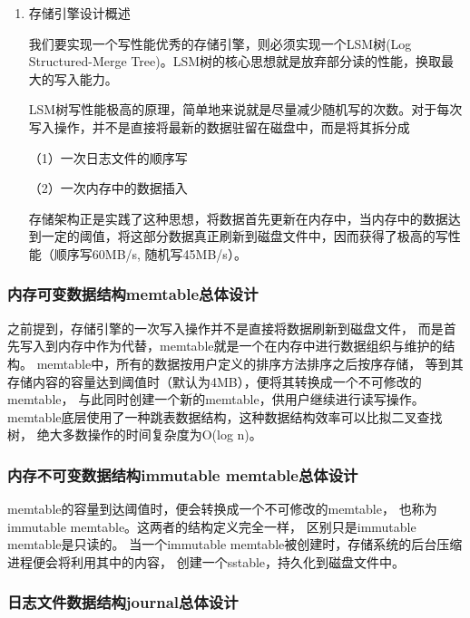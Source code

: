 	\begin{enumerate}[fullwidth,itemindent=2em,listparindent=2em]
	
		\item 存储引擎设计概述
		
		我们要实现一个写性能优秀的存储引擎，则必须实现一个LSM树(Log Structured-Merge Tree)。LSM树的核心思想就是放弃部分读的性能，换取最大的写入能力。

		LSM树写性能极高的原理，简单地来说就是尽量减少随机写的次数。对于每次写入操作，并不是直接将最新的数据驻留在磁盘中，而是将其拆分成
		
		（1）{一次日志文件的顺序写}

		（2）{一次内存中的数据插入}

		存储架构正是实践了这种思想，将数据首先更新在内存中，当内存中的数据达到一定的阈值，将这部分数据真正刷新到磁盘文件中，因而获得了极高的写性能（顺序写60MB/s, 随机写45MB/s）。

	\end{enumerate}
		\subsubsection{内存可变数据结构memtable总体设计}
		
		之前提到，存储引擎的一次写入操作并不是直接将数据刷新到磁盘文件，
		而是首先写入到内存中作为代替，memtable就是一个在内存中进行数据组织与维护的结构。
		memtable中，所有的数据按用户定义的排序方法排序之后按序存储，
		等到其存储内容的容量达到阈值时（默认为4MB），便将其转换成一个不可修改的memtable，
		与此同时创建一个新的memtable，供用户继续进行读写操作。
		memtable底层使用了一种跳表数据结构，这种数据结构效率可以比拟二叉查找树，
		绝大多数操作的时间复杂度为O(log n)。

		\subsubsection{内存不可变数据结构immutable memtable总体设计}

		memtable的容量到达阈值时，便会转换成一个不可修改的memtable，
		也称为immutable memtable。这两者的结构定义完全一样，
		区别只是immutable memtable是只读的。
		当一个immutable memtable被创建时，存储系统的后台压缩进程便会将利用其中的内容，
		创建一个sstable，持久化到磁盘文件中。

		\subsubsection{日志文件数据结构journal总体设计}

